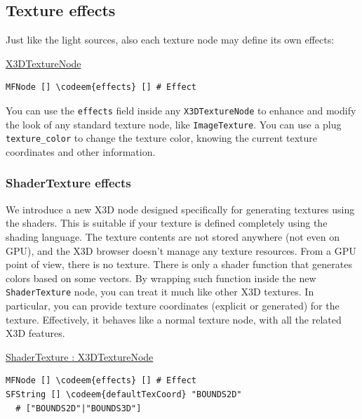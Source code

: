 \documentclass{egpubl}
\newenvironment{mycode}
{\begin{mycodecore}}
{\end{mycodecore}
\vspace{-0.1in}}
\newcommand*{\codeem}[1]{\textbf{#1}}
\begin{document}
\subsection{Texture effects}

Just like the light sources, also each texture node may define its own effects:

\begin{mycode}
\underline{X3DTextureNode}
\begin{Verbatim}[commandchars=\\\{\},fontsize=\small]
MFNode [] \codeem{effects} [] # Effect
\end{Verbatim}
\end{mycode}

You can use the \texttt{effects} field
inside any \texttt{X3DTextureNode} to enhance and modify the look of any
standard texture node, like \texttt{ImageTexture}.
You can use a plug \texttt{texture\_color} to change the texture color,
knowing the current texture coordinates and other information.

\subsubsection{ShaderTexture effects}

We introduce a new X3D node designed specifically for generating
textures using the shaders. This is suitable
if your texture is defined completely using the shading language.
The texture contents are not stored anywhere (not even on GPU),
and the X3D browser doesn't manage any texture resources.
From a GPU point of view, there is no texture.
There is only a shader function that generates colors
based on some vectors. By wrapping such function inside
the new \texttt{ShaderTexture} node, you can treat it much like other X3D textures.
In particular, you can provide texture coordinates (explicit or generated)
for the texture.
Effectively, it behaves like a normal texture node, with all the related
X3D features.


\begin{mycode}
\underline{ShaderTexture : X3DTextureNode}
\begin{Verbatim}[commandchars=\\\{\},fontsize=\small]
MFNode [] \codeem{effects} [] # Effect
SFString [] \codeem{defaultTexCoord} "BOUNDS2D"
  # ["BOUNDS2D"|"BOUNDS3D"]
\end{Verbatim}
\end{mycode}
\end{document}

